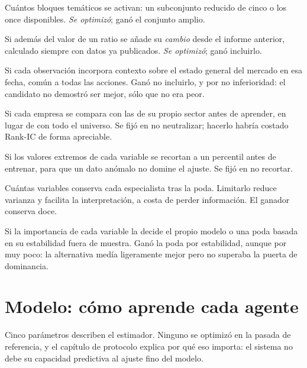 \begin{description}[leftmargin=0cm,style=nextline,itemsep=0.5em]
  \item[Conjunto de variables] Cuántos bloques temáticos se activan: un subconjunto reducido de
  cinco o los once disponibles. \emph{Se optimizó}; ganó el conjunto amplio.
  \item[Momentum fundamental] Si además del valor de un ratio se añade su \emph{cambio} desde el
  informe anterior, calculado siempre con datos ya publicados. \emph{Se optimizó}; ganó incluirlo.
  \item[Régimen de mercado] Si cada observación incorpora contexto sobre el estado general del
  mercado en esa fecha, común a todas las acciones. Ganó no incluirlo, y por no inferioridad: el
  candidato no demostró ser mejor, sólo que no era peor.
  \item[Neutralización sectorial] Si cada empresa se compara con las de su propio sector antes de
  aprender, en lugar de con todo el universo. Se fijó en no neutralizar; hacerlo habría costado
  Rank-IC de forma apreciable.
  \item[Winsorización] Si los valores extremos de cada variable se recortan a un percentil antes de
  entrenar, para que un dato anómalo no domine el ajuste. Se fijó en no recortar.
  \item[Máximo de variables por agente] Cuántas variables conserva cada especialista tras la poda.
  Limitarlo reduce varianza y facilita la interpretación, a costa de perder información. El ganador
  conserva doce.
  \item[Regla de ponderación de variables] Si la importancia de cada variable la decide el propio
  modelo o una poda basada en su estabilidad fuera de muestra. Ganó la poda por estabilidad, aunque
  por muy poco: la alternativa medía ligeramente mejor pero no superaba la puerta de dominancia.
\end{description}

\section{Modelo: cómo aprende cada agente}

Cinco parámetros describen el estimador. Ninguno se optimizó en la pasada de referencia, y el
capítulo de protocolo explica por qué eso importa: el sistema no debe su capacidad predictiva al
ajuste fino del modelo.

